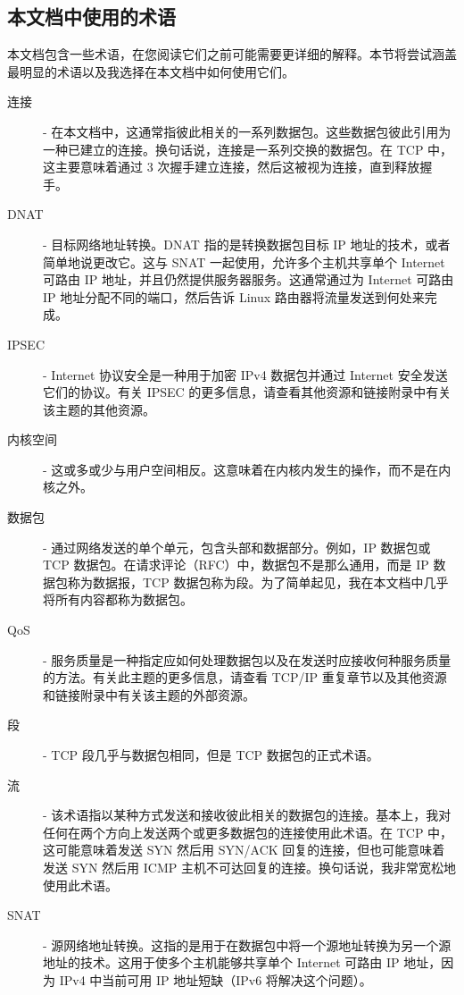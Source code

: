 \documentclass[12pt,UTF8]{ctexbook}
\begin{document}
\subsection{本文档中使用的术语}
本文档包含一些术语，在您阅读它们之前可能需要更详细的解释。本节将尝试涵盖最明显的术语以及我选择在本文档中如何使用它们。

\begin{description}
  \item[连接] - 在本文档中，这通常指彼此相关的一系列数据包。这些数据包彼此引用为一种已建立的连接。换句话说，连接是一系列交换的数据包。在 TCP 中，这主要意味着通过 3 次握手建立连接，然后这被视为连接，直到释放握手。
  
  \item[DNAT] - 目标网络地址转换。DNAT 指的是转换数据包目标 IP 地址的技术，或者简单地说更改它。这与 SNAT 一起使用，允许多个主机共享单个 Internet 可路由 IP 地址，并且仍然提供服务器服务。这通常通过为 Internet 可路由 IP 地址分配不同的端口，然后告诉 Linux 路由器将流量发送到何处来完成。
  
  \item[IPSEC] - Internet 协议安全是一种用于加密 IPv4 数据包并通过 Internet 安全发送它们的协议。有关 IPSEC 的更多信息，请查看其他资源和链接附录中有关该主题的其他资源。
  
  \item[内核空间] - 这或多或少与用户空间相反。这意味着在内核内发生的操作，而不是在内核之外。
  
  \item[数据包] - 通过网络发送的单个单元，包含头部和数据部分。例如，IP 数据包或 TCP 数据包。在请求评论（RFC）中，数据包不是那么通用，而是 IP 数据包称为数据报，TCP 数据包称为段。为了简单起见，我在本文档中几乎将所有内容都称为数据包。
  
  \item[QoS] - 服务质量是一种指定应如何处理数据包以及在发送时应接收何种服务质量的方法。有关此主题的更多信息，请查看 TCP/IP 重复章节以及其他资源和链接附录中有关该主题的外部资源。
  
  \item[段] - TCP 段几乎与数据包相同，但是 TCP 数据包的正式术语。
  
  \item[流] - 该术语指以某种方式发送和接收彼此相关的数据包的连接。基本上，我对任何在两个方向上发送两个或更多数据包的连接使用此术语。在 TCP 中，这可能意味着发送 SYN 然后用 SYN/ACK 回复的连接，但也可能意味着发送 SYN 然后用 ICMP 主机不可达回复的连接。换句话说，我非常宽松地使用此术语。
  
  \item[SNAT] - 源网络地址转换。这指的是用于在数据包中将一个源地址转换为另一个源地址的技术。这用于使多个主机能够共享单个 Internet 可路由 IP 地址，因为 IPv4 中当前可用 IP 地址短缺（IPv6 将解决这个问题）。
  

\end{description}
\end{document}
